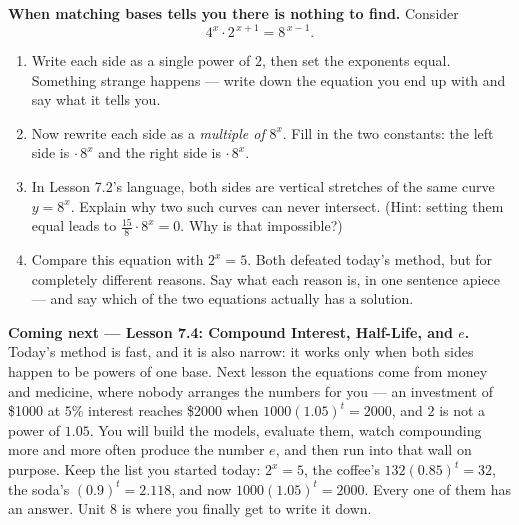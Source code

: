 \documentclass[10pt]{article}
\begin{document}
\begin{extensionbox}
\textbf{When matching bases tells you there is nothing to find.} Consider
\[
  4^{x}\cdot 2^{\,x+1} = 8^{\,x-1}.
\]
\begin{enumerate}[label=(\alph*), leftmargin=1.8em, itemsep=5pt]
  \item Write each side as a single power of $2$, then set the exponents equal. Something strange
        happens --- write down the equation you end up with and say what it tells you.
  \item Now rewrite each side as a \emph{multiple of} $8^{x}$. Fill in the two constants:
        the left side is \blank{1.4cm} $\cdot\,8^{x}$ and the right side is \blank{1.4cm}
        $\cdot\,8^{x}$.
  \item In Lesson 7.2's language, both sides are vertical stretches of the same curve $y=8^{x}$.
        Explain why two such curves can never intersect. (Hint: setting them equal leads to
        $\frac{15}{8}\cdot 8^{x}=0$. Why is that impossible?)
  \item Compare this equation with $2^{x}=5$. Both defeated today's method, but for completely
        different reasons. Say what each reason is, in one sentence apiece --- and say which of the
        two equations actually has a solution.
\end{enumerate}
\end{extensionbox}

\begin{spiralbox}
\textbf{Coming next --- Lesson 7.4: Compound Interest, Half-Life, and $e$.} Today's method is fast, and
it is also narrow: it works only when both sides happen to be powers of one base. Next lesson the
equations come from money and medicine, where nobody arranges the numbers for you --- an investment of
\$1000 at $5\%$ interest reaches \$2000 when $1000(1.05)^{t}=2000$, and $2$ is not a power of $1.05$.
You will build the models, evaluate them, watch compounding more and more often produce the number
$e$, and then run into that wall on purpose. Keep the list you started today: $2^{x}=5$, the coffee's
$132(0.85)^{t}=32$, the soda's $(0.9)^{t}=2.118$, and now $1000(1.05)^{t}=2000$. Every one of them has
an answer. Unit 8 is where you finally get to write it down.
\end{spiralbox}
\end{document}
